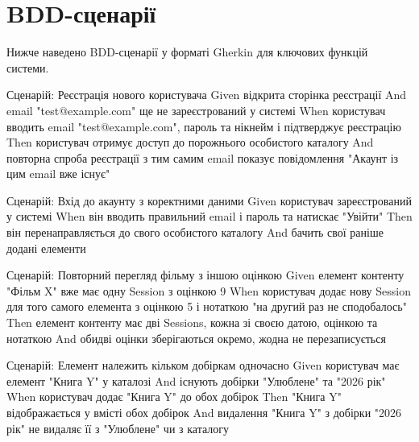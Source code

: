 \section{BDD-сценарії}
\label{sec:bdd}

Нижче наведено BDD-сценарії у форматі Gherkin для ключових функцій системи.

\begin{codelisting}
\caption{BDD-сценарії системи}
\label{lst:bdd}
\begin{skedcode}
Сценарій: Реєстрація нового користувача
  Given відкрита сторінка реєстрації
  And email "test@example.com" ще не зареєстрований у системі
  When користувач вводить email "test@example.com", пароль та нікнейм
    і підтверджує реєстрацію
  Then користувач отримує доступ до порожнього особистого каталогу
  And повторна спроба реєстрації з тим самим email показує повідомлення
    "Акаунт із цим email вже існує"
\end{skedcode}
\end{codelisting}

\begin{codelisting}
\caption{Вхід до акаунту}
\label{lst:bdd-login}
\begin{skedcode}
Сценарій: Вхід до акаунту з коректними даними
  Given користувач зареєстрований у системі
  When він вводить правильний email і пароль та натискає "Увійти"
  Then він перенаправляється до свого особистого каталогу
  And бачить свої раніше додані елементи
\end{skedcode}
\end{codelisting}

\begin{codelisting}
\caption{Повторний перегляд з іншою оцінкою}
\label{lst:bdd-session}
\begin{skedcode}
Сценарій: Повторний перегляд фільму з іншою оцінкою
  Given елемент контенту "Фільм X" вже має одну Session з оцінкою 9
  When користувач додає нову Session для того самого елемента
    з оцінкою 5 і нотаткою "на другий раз не сподобалось"
  Then елемент контенту має дві Sessions, кожна зі своєю датою,
    оцінкою та нотаткою
  And обидві оцінки зберігаються окремо, жодна не перезаписується
\end{skedcode}
\end{codelisting}

\begin{codelisting}
\caption{Елемент у кількох добірках}
\label{lst:bdd-collection}
\begin{skedcode}
Сценарій: Елемент належить кільком добіркам одночасно
  Given користувач має елемент "Книга Y" у каталозі
  And існують добірки "Улюблене" та "2026 рік"
  When користувач додає "Книга Y" до обох добірок
  Then "Книга Y" відображається у вмісті обох добірок
  And видалення "Книга Y" з добірки "2026 рік" не видаляє її
    з "Улюблене" чи з каталогу
\end{skedcode}
\end{codelisting}

